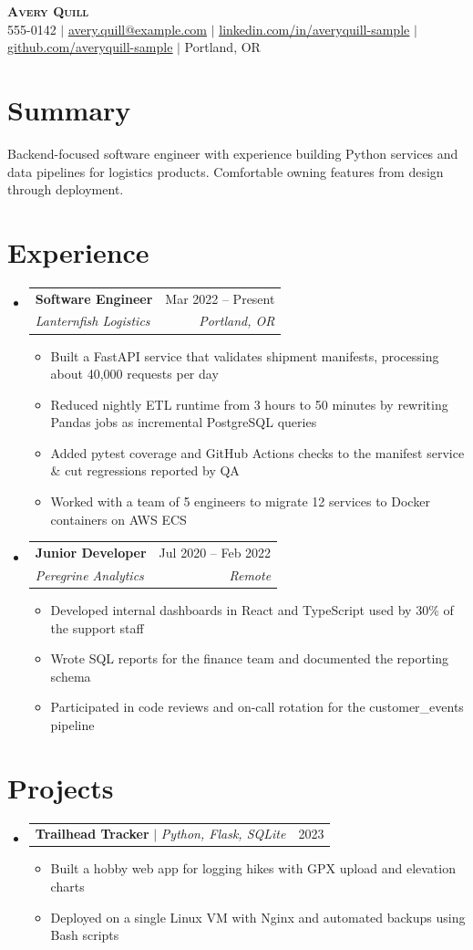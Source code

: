\documentclass[letterpaper,11pt]{article}
\makeatletter
\newcommand{\resumeItem}[1]{\item\small{#1 \vspace{-2pt}}}
\newcommand{\resumeSubheading}[4]{
  \vspace{-2pt}\item
    \begin{tabular*}{0.97\textwidth}[t]{l@{\extracolsep{\fill}}r}
      \textbf{#1} & #2 \\
      \textit{\small#3} & \textit{\small #4} \\
    \end{tabular*}\vspace{-7pt}
}
\newcommand{\resumeProjectHeading}[2]{
    \item
    \begin{tabular*}{0.97\textwidth}{l@{\extracolsep{\fill}}r}
      \small#1 & #2 \\
    \end{tabular*}\vspace{-7pt}
}
\newcommand{\resumeSubHeadingListStart}{\begin{itemize}[leftmargin=0.15in, label={}]}
\newcommand{\resumeSubHeadingListEnd}{\end{itemize}}
\newcommand{\resumeItemListStart}{\begin{itemize}}
\newcommand{\resumeItemListEnd}{\end{itemize}\vspace{-5pt}}
\makeatother
\begin{document}
\begin{center}
    \textbf{\Huge \scshape Avery Quill} \\ \vspace{1pt}
    \small 555-0142 $|$ \href{mailto:avery.quill@example.com}{\underline{avery.quill@example.com}} $|$
    \href{https://linkedin.com/in/averyquill-sample}{\underline{linkedin.com/in/averyquill-sample}} $|$
    \href{https://github.com/averyquill-sample}{\underline{github.com/averyquill-sample}} $|$ Portland, OR
\end{center}

\section{Summary}
Backend-focused software engineer with experience building Python services and data pipelines
for logistics products. Comfortable owning features from design through deployment. %

\section{Experience}
  \resumeSubHeadingListStart

    \resumeSubheading
      {Software Engineer}{Mar 2022 -- Present}
      {Lanternfish Logistics}{Portland, OR}
      \resumeItemListStart
        \resumeItem{Built a FastAPI service that validates shipment manifests, processing about 40,000 requests per day}
        \resumeItem{Reduced nightly ETL runtime from 3 hours to 50 minutes by rewriting Pandas jobs as incremental PostgreSQL queries}
        \resumeItem{Added pytest coverage and GitHub Actions checks to the manifest service \& cut regressions reported by QA}
        \resumeItem{Worked with a team of 5 engineers to migrate 12 services to Docker containers on AWS ECS}
      \resumeItemListEnd

    \resumeSubheading
      {Junior Developer}{Jul 2020 -- Feb 2022}
      {Peregrine Analytics}{Remote}
      \resumeItemListStart
        \resumeItem{Developed internal dashboards in React and TypeScript used by 30\% of the support staff}
        \resumeItem{Wrote SQL reports for the finance team and documented the reporting schema}
        \resumeItem{Participated in code reviews and on-call rotation for the customer\_events pipeline}
      \resumeItemListEnd

  \resumeSubHeadingListEnd

\section{Projects}
    \resumeSubHeadingListStart
      \resumeProjectHeading
          {\textbf{Trailhead Tracker} $|$ \emph{Python, Flask, SQLite}}{2023}
          \resumeItemListStart
            \resumeItem{Built a hobby web app for logging hikes with GPX upload and elevation charts}
            \resumeItem{Deployed on a single Linux VM with Nginx and automated backups using Bash scripts}
          \resumeItemListEnd
    \resumeSubHeadingListEnd
\end{document}
